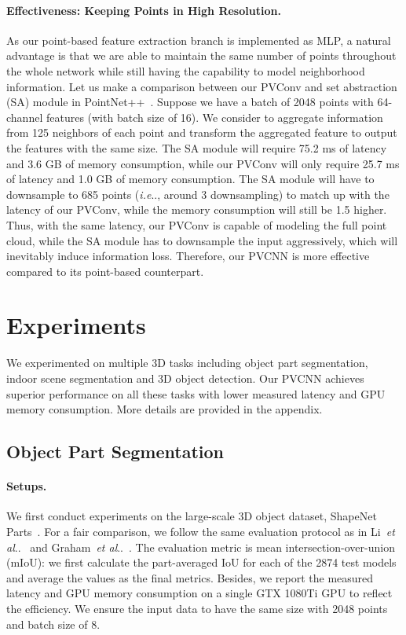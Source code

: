 \documentclass{article}
\makeatletter
\DeclareRobustCommand\onedot{\futurelet\@let@token\@onedot}
\def\@onedot{\ifx\@let@token.\else.\null\fi\xspace}
\def\ie{\emph{i.e}\onedot} \def\Ie{\emph{I.e}\onedot}
\def\etal{\emph{et al}\onedot}
\newcommand{\myparagraph}[1]{\vspace{-6pt}\paragraph{#1}}
\def\modelshort{PVCNN\xspace}
\def\convshort{PVConv\xspace}
\makeatother
\begin{document}
\myparagraph{Effectiveness: Keeping Points in High Resolution.}

As our point-based feature extraction branch is implemented as MLP, a natural advantage is that we are able to maintain the same number of points throughout the whole network while still having the capability to model neighborhood information. Let us make a comparison between our \convshort and set abstraction (SA) module in PointNet++~\cite{Qi:2017tf}. Suppose we have a batch of 2048 points with 64-channel features (with batch size of 16). We consider to aggregate information from 125 neighbors of each point and transform the aggregated feature to output the features with the same size. The SA module will require 75.2 ms of latency and 3.6 GB of memory consumption, while our \convshort will only require 25.7 ms of latency and 1.0 GB of memory consumption. The SA module will have to downsample to 685 points (\ie, around 3 downsampling) to match up with the latency of our \convshort, while the memory consumption will still be 1.5 higher. Thus, with the same latency, our \convshort is capable of modeling the full point cloud, while the SA module has to downsample the input aggressively, which will inevitably induce information loss. Therefore, our \modelshort is more effective compared to its point-based counterpart. \section{Experiments}
\label{sec:exp}

We experimented on multiple 3D tasks including object part segmentation, indoor scene segmentation and 3D object detection. Our \modelshort achieves superior performance on all these tasks with lower measured latency and GPU memory consumption. More details are provided in the appendix.

\subsection{Object Part Segmentation}

\paragraph{Setups.}

We first conduct experiments on the large-scale 3D object dataset, ShapeNet Parts~\cite{Chang:2015sn}. For a fair comparison, we follow the same evaluation protocol as in Li~\etal~\cite{Li:2018tp} and Graham~\etal~\cite{Graham:2018ss}. The evaluation metric is mean intersection-over-union (mIoU): we first calculate the part-averaged IoU for each of the 2874 test models and average the values as the final metrics. Besides, we report the measured latency and GPU memory consumption on a single GTX 1080Ti GPU to reflect the efficiency. We ensure the input data to have the same size with 2048 points and batch size of 8.
\end{document}
